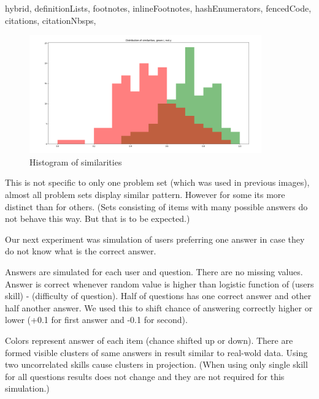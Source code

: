 \documentclass[
  digital, %
  table,   %
  nolof,     %
  nolot,     %
  nocover
]{fithesis3}
\begin{document}
\begin{markdown*}{%
  hybrid,
  definitionLists,
  footnotes,
  inlineFootnotes,
  hashEnumerators,
  fencedCode,
  citations,
  citationNbsps,
}
\begin{figure}
  \begin{center}
    \includegraphics[width=10cm]{img/iy_histogram}
  \end{center}
  \caption{Histogram of similarities}
  \label{ref:iyhistogram}
\end{figure}



This is not specific to only one problem set (which was used in previous images), almost all problem sets display similar pattern. However for some its more distinct than for others. (Sets consisting of items with many possible answers do not behave this way. But that is to be expected.)


Our next experiment was simulation of users preferring one answer in case they do not know what is the correct answer.

Answers are simulated for each user and question. There are no missing values. Answer is correct whenever random value is higher than logistic function of (users skill) - (difficulty of question). Half of questions has one correct answer and other half another answer. We used this to shift chance of answering correctly higher or lower (+0.1 for first answer and -0.1 for second).


Colors represent answer of each item (chance shifted up or down). There are formed visible clusters of same answers in result similar to real-wold data. Using two uncorrelated skills cause clusters in projection. (When using only single skill for all questions results does not change and they are not required for this simulation.)


\end{markdown*}
\end{document}
